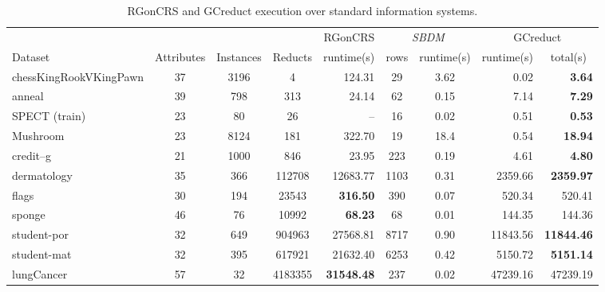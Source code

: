 \documentclass[authoryear,preprint,review,12pt]{elsarticle}
\begin{document}
	\begin{table}[!htb]
		\setlength{\tabcolsep}{3pt}
		\caption{RGonCRS and GCreduct execution over standard information systems.}\label{tab:matlab}
		\centering \scriptsize
		\begin{tabular}{|l|c|c|c|r|c|c|r|r|}
			\hline
			&&&& RGonCRS & \multicolumn{2}{c|}{\textit{SBDM}} & \multicolumn{2}{c|}{GCreduct}\\ %
			\cline{6-9}
			Dataset & Attributes & Instances & Reducts & \multicolumn{1}{c|}{runtime(s)} & rows & runtime(s) & \multicolumn{1}{c|}{runtime(s)} & \multicolumn{1}{c|}{total(s)} \\ %
			\hline
			chessKingRookVKingPawn & 37 & 3196 & 4 & 124.31 & 29 & 3.62 & 0.02 & \textbf{3.64}\\ %
			anneal	& 39 & 798 & 313 & 24.14 & 62 & 0.15 & 7.14 & \textbf{7.29} \\ %
			SPECT (train) & 23 & 80 & 26 & -- & 16 & 0.02 & 0.51 & \textbf{0.53} \\
			Mushroom & 23 & 8124 & 181 & 322.70 & 19 & 18.4 & 0.54 & \textbf{18.94} \\
			credit--g & 21 & 1000 & 846 & 23.95 & 223 & 0.19 & 4.61 & \textbf{4.80} \\ %
			dermatology & 35 & 366 & 112708 & 12683.77 & 1103 & 0.31 & 2359.66 & \textbf{2359.97} \\ %
			flags & 30 & 194 & 23543 & \textbf{316.50} & 390 & 0.07 & 520.34 & 520.41 \\ %
			sponge & 46 & 76 & 10992 & \textbf{68.23} & 68 & 0.01 & 144.35 & 144.36 \\ %
			student-por & 32 & 649 & 904963 & 27568.81 & 8717 & 0.90 & 11843.56 & \textbf{11844.46} \\
			student-mat & 32 & 395 & 617921 & 21632.40 & 6253 & 0.42 & 5150.72 & \textbf{5151.14}\\
			lungCancer & 57 & 32 & 4183355 & \textbf{31548.48} & 237 & 0.02 & 47239.16 & 47239.19 \\ %

\end{tabular}
\end{table}
\end{document}

